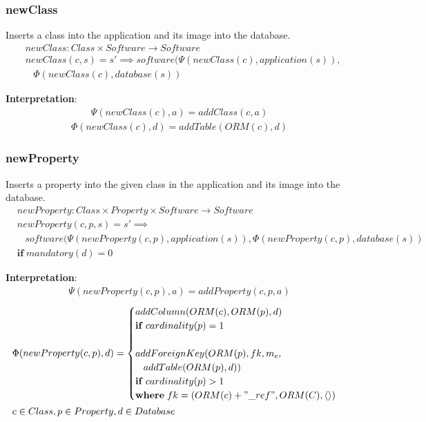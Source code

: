 \documentclass[10pt]{article}
\begin{document}
\subsubsection{newClass}
Inserts a class into the application and its image into the database.
\begin{align}
& newClass: Class \times Software \rightarrow Software \\
& newClass(c, s) = s' \implies software(\Psi(newClass(c), application(s)), \nonumber \\
& \;\;\; \Phi(newClass(c), database(s))
\end{align}

\noindent \textbf{Interpretation}:
\begin{align}
\Psi(newClass(c), a) = addClass(c, a)
\end{align}
\begin{align}
\Phi(newClass(c), d) = addTable(ORM(c),  d)
\end{align}


\subsubsection{newProperty}
Inserts a property into the given class in the application and its image into the database.
\begin{align}
& newProperty: Class \times Property \times Software \rightarrow Software \\
& newProperty(c, p, s) = s' \implies \nonumber \\ 
& \;\;\; software(\Psi(newProperty(c, p), application(s)), \Phi(newProperty(c,p), database(s)) \\
& \mathbf{if}\; mandatory(d) = 0
\end{align}

\noindent \textbf{Interpretation}:
\begin{align}
\Psi(newProperty(c, p), a) = addProperty(c, p, a)
\end{align}
\begin{align}
&\Phi(newProperty(c, p), d) = \begin{cases}
  addColumn(ORM(c), ORM(p),  d) \\ \mathbf{if} \; cardinality(p) = 1  \\\\ 
  addForeignKey(ORM(p), fk , m_e,  \\
  \;\;\; addTable(ORM(p),  d)) \\
  \mathbf{if} \; cardinality(p) > 1  \\
  \mathbf{where} \; fk = (ORM(c) + "\_ref", ORM(C), \langle \rangle)
   \end{cases}\\
& c \in Class, p \in Property, d \in Database   \nonumber
\end{align}
\end{document}

